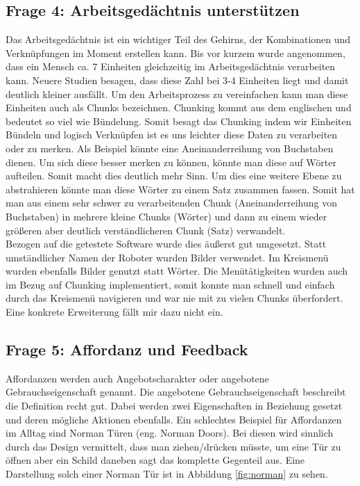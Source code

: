 \documentclass{TUBAFarbeiten}
\begin{document}
\subsection{Frage 4: Arbeitsgedächtnis unterstützen}
Das Arbeitsgedächtnis ist ein wichtiger Teil des Gehirns, der Kombinationen und Verknüpfungen im Moment erstellen kann. Bis vor kurzem wurde angenommen, dass ein Mensch ca. 7 Einheiten gleichzeitig im Arbeitsgedächtnis verarbeiten kann. Neuere Studien besagen, dass diese Zahl bei 3-4 Einheiten liegt und damit deutlich kleiner ausfällt. Um den Arbeitsprozess zu vereinfachen kann man diese Einheiten auch als Chunks bezeichnen. Chunking kommt aus dem englischen und bedeutet so viel wie Bündelung. Somit besagt das Chunking indem wir Einheiten Bündeln und logisch Verknüpfen ist es uns leichter diese Daten zu verarbeiten oder zu merken. Als Beispiel könnte eine Aneinanderreihung von Buchstaben dienen. Um sich diese besser merken zu können, könnte man diese auf Wörter aufteilen. Somit macht dies deutlich mehr Sinn. Um dies eine weitere Ebene zu abstrahieren könnte man diese Wörter zu einem Satz zusammen fassen. Somit hat man aus einem sehr schwer zu verarbeitenden Chunk (Aneinanderreihung von Buchstaben) in mehrere kleine Chunks (Wörter) und dann zu einem wieder größeren aber deutlich verständlicheren Chunk (Satz) verwandelt. \\
Bezogen auf die getestete Software wurde dies äußerst gut umgesetzt. Statt umständlicher Namen der Roboter wurden Bilder verwendet. Im Kreismenü wurden ebenfalls Bilder genutzt statt Wörter. Die Menütätigkeiten wurden auch im Bezug auf Chunking implementiert, somit konnte man schnell und einfach durch das Kreismenü navigieren und war nie mit zu vielen Chunks überfordert. Eine konkrete Erweiterung fällt mir dazu nicht ein.

\subsection{Frage 5: Affordanz und Feedback}
Affordanzen werden auch Angebotscharakter oder angebotene Gebrauchseigenschaft genannt. Die angebotene Gebrauchseigenschaft beschreibt die Definition recht gut. Dabei werden zwei Eigenschaften in Beziehung gesetzt und deren mögliche Aktionen ebenfalls. Ein schlechtes Beispiel für Affordanzen im Alltag sind Norman Türen (eng. Norman Doors). Bei diesen wird sinnlich durch das Design vermittelt, dass man ziehen/drücken müsste, um eine Tür zu öffnen aber ein Schild daneben sagt das komplette Gegenteil aus. Eine Darstellung solch einer Norman Tür  ist in Abbildung \ref{fig:norman} zu sehen. 
\end{document}
